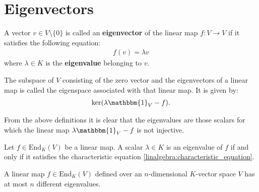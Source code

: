 \section{Eigenvectors}

    \begin{definition}[Eigenvector]
        A vector $v\in V\setminus\{0\}$ is called an \textbf{eigenvector} of the linear map $f:V\rightarrow V$ if it satisfies the following equation:
       \begin{gather}
            f(v) = \lambda v
        \end{gather}
       where $\lambda\in K$ is the \textbf{eigenvalue} belonging to $v$.
    \end{definition}
    \begin{definition}[Eigenspace]
        The subspace of $V$ consisting of the zero vector and the eigenvectors of a linear map is called the eigenspace associated with that linear map. It is given by:
        \begin{gather}
            \text{ker}(\lambda\mathbbm{1}_V - f).
        \end{gather}
    \end{definition}
    \begin{remark}\label{linalgebra:eigenvalue_remark}
        From the above definitions it is clear that the eigenvalues are those scalars for which the linear map $\lambda\mathbbm{1}_V-f$ is not injective.
    \end{remark}

    \begin{theorem}\label{linalgebra:theorem:eigenvalue_characteristic_equation}
        Let $f\in\text{End}_K(V)$ be a linear map. A scalar $\lambda\in K$ is an eigenvalue of $f$ if and only if it satisfies the characteristic equation \ref{linalgebra:characteristic_equation}.
    \end{theorem}

    \begin{theorem}
        A linear map $f\in\text{End}_K(V)$ defined over an $n$-dimensional $K$-vector space $V$ has at most $n$ different eigenvalues.
    \end{theorem}

